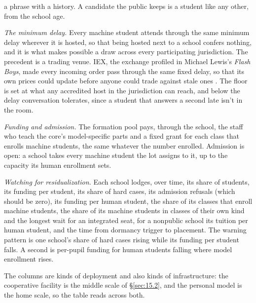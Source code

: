 a phrase with a history. A candidate the public keeps is a student like any other, from the school age.

\emph{The minimum delay.} Every machine student attends through the same minimum delay wherever it is hosted, so that being hosted next to a school confers nothing, and it is what makes possible a draw across every participating jurisdiction. The precedent is a trading venue. IEX, the exchange profiled in Michael Lewis's \emph{Flash Boys}, made every incoming order pass through the same fixed delay, so that its own prices could update before anyone could trade against stale ones \autocite{lewis2014flashboys,iex2026speedbump}. The floor is set at what any accredited host in the jurisdiction can reach, and below the delay conversation tolerates, since a student that answers a second late isn't in the room.

\emph{Funding and admission.} The formation pool pays, through the school, the staff who teach the core's model-specific parts and a fixed grant for each class that enrolls machine students, the same whatever the number enrolled. Admission is open: a school takes every machine student the lot assigns to it, up to the capacity its human enrollment sets.

\emph{Watching for residualization.} Each school lodges, over time, its share of students, its funding per student, its share of hard cases, its admission refusals (which should be zero), its funding per human student, the share of its classes that enroll machine students, the share of its machine students in classes of their own kind and the longest wait for an integrated seat, for a nonpublic school its tuition per human student, and the time from dormancy trigger to placement. The warning pattern is one school's share of hard cases rising while its funding per student falls. A second is per-pupil funding for human students falling where model enrollment rises.


The columns are kinds of deployment and also kinds of infrastructure: the cooperative facility is the middle scale of \S\ref{sec:15.2}, and the personal model is the home scale, so the table reads across both.

